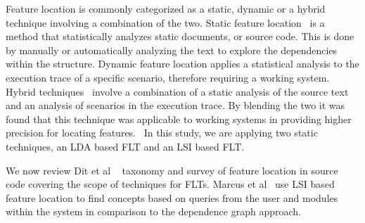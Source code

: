 Feature location is commonly categorized as a static, dynamic or a hybrid
technique involving a combination of the two. Static feature
location~\cite{biggers2014configuring} is a method that statistically analyzes
static documents, or source code. This is done by manually or automatically
analyzing the text to explore the dependencies within the structure. Dynamic
feature location applies a statistical analysis to the execution trace of a
specific scenario, therefore requiring a working system.~\cite{972777,4181710}
Hybrid techniques~\cite{1183929} involve a combination of a static analysis of
the source text and an analysis of scenarios in the execution trace. By
blending the two it was found that this technique was applicable to working
systems in providing higher precision for locating features.~\cite{4181710,
ernst2004static, revelleimproving} In this study, we are applying two static techniques, an LDA based FLT and an LSI based FLT. 

We now review Dit et al ~\cite{dit2013feature} taxonomy and survey of feature
location in source code covering the scope of techniques for FLTs.
Marcus et al~\cite{1374321} use LSI based feature location to find concepts based on queries from the user and modules within the system in comparison to the dependence graph approach. 


